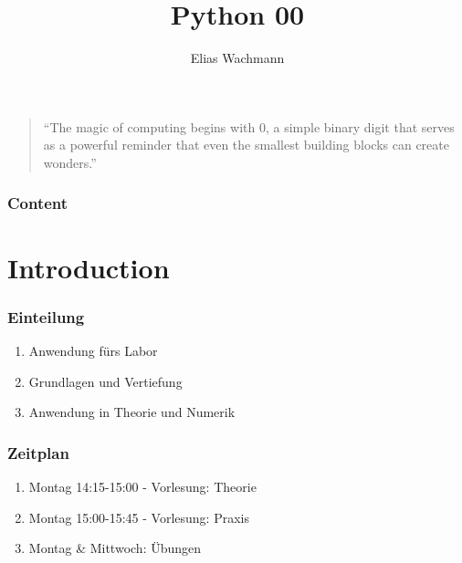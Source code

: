 \documentclass{beamer}
\title[]
{Python 00}
\author[E.~Wachmann]{\scriptsize Elias Wachmann
}
\date{\the\year} %
\institute[Institute of Theoretical and Computational Physics]
{
}
\begin{document}
\titleframe


\begin{frame}
  \vspace*{\fill}
  \begin{center}
    \begin{quote}
        ``The magic of computing begins with 0, a simple binary digit that serves as a powerful reminder that even the smallest building blocks can create wonders.''
    \end{quote}
\end{center}
\vspace*{\fill}
\end{frame}

\begin{frame}
\frametitle{Content}
  \tableofcontents
\end{frame}

\label{sec:intro}
\section{Introduction}
\begin{frame}
  \frametitle{Einteilung}
  \begin{enumerate}
    \item Anwendung fürs Labor
    \item Grundlagen und Vertiefung
    \item Anwendung in Theorie und Numerik
  \end{enumerate}
\end{frame}

\begin{frame}
  \frametitle{Zeitplan}
  \begin{enumerate}
    \item Montag 14:15-15:00 - Vorlesung: Theorie
    \item Montag 15:00-15:45 - Vorlesung: Praxis
    \item Montag \& Mittwoch: Übungen
  \end{enumerate}
\end{frame}
\end{document}
